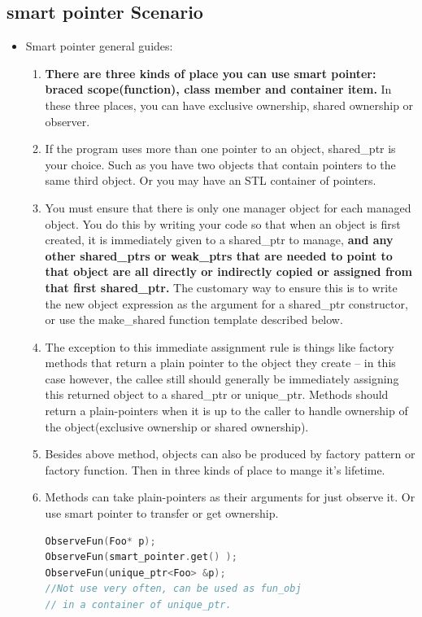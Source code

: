\documentclass[a4paper,12pt,twoside]{book}
\begin{document}
\subsection{smart pointer Scenario}

\begin{itemize}

\item Smart pointer general guides:

\begin{enumerate}
\item \textbf{There are three kinds of place you can use smart pointer: braced scope(function), class member and container item.} In these three places, you can have exclusive ownership, shared ownership or observer.  



\item If the program uses more than one pointer to an object, shared\_ptr is your choice.  Such as you have two objects that contain pointers to the same third object. Or you may have an STL container of pointers.

\item You must ensure that there is only one manager object for each managed object. You do this by writing your code so that when an object is first created, it is immediately given to a shared\_ptr to manage, \textbf{and any other shared\_ptrs or weak\_ptrs that are needed to point to that object are all directly or indirectly copied or assigned from that first shared\_ptr.} The customary way to ensure this is to write the new object expression as the argument for a shared\_ptr constructor, or use the make\_shared function template described below.

\item The exception to this immediate assignment rule is things like factory methods that return a plain pointer to the object they create -- in this case however, the callee still should generally be immediately assigning this returned object to a shared\_ptr or unique\_ptr.  Methods should return a plain-pointers when it is up to the caller to handle ownership of the object(exclusive ownership or shared ownership).

\item Besides above method, objects can also be produced by factory pattern or factory function. Then in three kinds of place to mange it's lifetime. 

\item Methods can take plain-pointers as their arguments for just observe it. Or use smart pointer to transfer or get ownership.
\begin{lstlisting}[frame=single, language=c++]
ObserveFun(Foo* p);
ObserveFun(smart_pointer.get() );
ObserveFun(unique_ptr<Foo> &p);
//Not use very often, can be used as fun_obj
// in a container of unique_ptr.


\end{lstlisting}
\end{enumerate}
\end{itemize}
\end{document}
